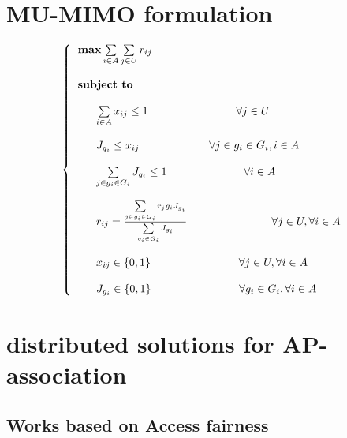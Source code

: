 \documentclass[journal,transmag]{IEEEtran}
\begin{document}
\section{MU-MIMO formulation \cite{15AP_association_MIMO}} 
\begin{footnotesize}
\begin{equation}
\left\{
\begin{tabular}{l} 
$\textbf{max}  \sum\limits_{i \in A} \sum\limits_{j \in U} r_{ij}$ \\         
\\
\textbf{subject to} \\

\\
~~~~~$ \sum\limits_{i \in A} x_{ij} \leq 1 $ ~~~~~~~~~~~~~~~~~~~~~~ $\forall j \in U $  \\

\\
~~~~~$ J_{g_i} \leq x_{ij}   $ ~~~~~~~~~~~~~~~~~ $ \forall j \in g_i \in G_i, i\in A$  \\


\\
~~~~~$ \sum\limits_{j \in g_i \in G_i} J_{g_i} \leq 1 $ ~~~~~~~~~~~~~~~~~~~ $\forall i \in A $  \\


\\
~~~~~$ r_{ij}= \frac{\sum\limits_{j \in g_i \in G_i} r_j{g_i} J_{g_i}}{\sum\limits_{g_i \in G_i} J_{g_i}}  $~~~~~~~~~~~~~~~~~~~~~~ $\forall j \in U,  \forall i \in A $  \\



\\
~~~~~$ x_{ij} \in \{0,1 \} $ ~~~~~~~~~~~~~~~~~~~~~~ $\forall j \in U,  \forall i \in A $  \\

\\
~~~~~$ J_{g_i} \in \{0,1 \} $ ~~~~~~~~~~~~~~~~~~~~~~ $\forall g_i \in G_i,  \forall i \in A $  \\

\end{tabular}
\right.
\end{equation}
\end{footnotesize}

\section{distributed solutions for AP-association}

\subsection{Works based on Access fairness}
\end{document}
